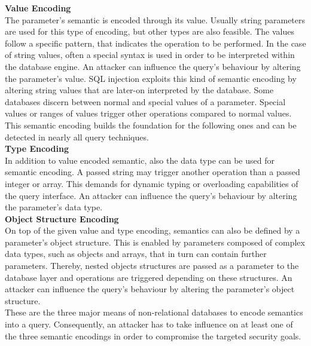 \textbf{Value Encoding} \\
The parameter's semantic is encoded through its value. Usually string parameters are used for this type of encoding, but other types are also feasible. The values follow a specific pattern, that indicates the operation to be performed. In the case of string values, often a special syntax is used in order to be interpreted within the database engine. An attacker can influence the query's behaviour by altering the parameter's value. SQL injection exploits this kind of semantic encoding by altering string values that are later-on interpreted by the database. Some databases discern between normal and special values of a parameter. Special values or ranges of values trigger other operations compared to normal values. This semantic encoding builds the foundation for the following ones and can be detected in nearly all query techniques.\\

\textbf{Type Encoding} \\
In addition to value encoded semantic, also the data type can be used for semantic encoding. A passed string may trigger another operation than a passed integer or array. This demands for dynamic typing or overloading capabilities of the query interface. An attacker can influence the query's behaviour by altering the parameter's data type.\\

\textbf{Object Structure Encoding} \\
On top of the given value and type encoding, semantics can also be defined by a parameter's object structure. This is enabled by parameters composed of complex data types, such as objects and arrays, that in turn can contain further parameters. Thereby, nested objects structures are passed as a parameter to the database layer and operations are triggered depending on these structures. An attacker can influence the query's behaviour by altering the parameter's object structure.\\

These are the three major means of non-relational databases to encode semantics into a query. Consequently, an attacker has to take influence on at least one of the three semantic encodings in order to compromise the targeted security goals.


